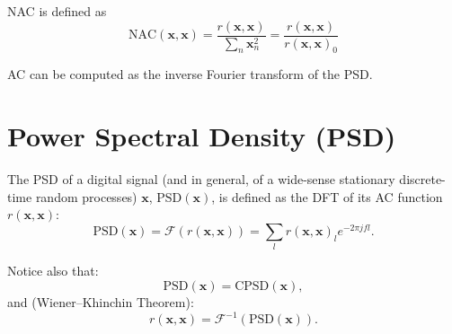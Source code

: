 \gls{NAC} is defined as
\begin{equation}
  {\text{NAC}(\mathbf{x},\mathbf{x})} = \frac{{r(\mathbf{x},\mathbf{x})}}{\sum_n \mathbf{x}_n^2} = \frac{{r(\mathbf{x},\mathbf{x})}}{{r(\mathbf{x},\mathbf{x})}_0}
\end{equation}

\gls{AC} can be computed as the inverse Fourier transform of
the \gls{PSD}.


\section{Power Spectral Density (PSD)}
\label{sec:PSD}

The \gls{PSD} of a digital signal (and in general, of a wide-sense
stationary discrete-time random processes) $\mathbf{x}$,
$\text{PSD}(\mathbf{x})$, is defined as the \gls{DFT} of its
\gls{AC} function $r(\mathbf{x},\mathbf{x})$:
\begin{equation}
  \text{PSD}(\mathbf{x}) = \mathcal{F}(r(\mathbf{x},\mathbf{x})) = \sum_l r(\mathbf{x},\mathbf{x})_le^{-2\pi jfl}.
\end{equation}

Notice also that:
\begin{equation}
  \text{PSD}(\mathbf{x}) = \text{CPSD}(\mathbf{x}),
\end{equation}
and (Wiener–Khinchin Theorem):
\begin{equation}
  r(\mathbf{x},\mathbf{x}) = \mathcal{F}^{-1}(\text{PSD}(\mathbf{x})).
\end{equation}


\begin{comment}
\section{Energy Spectral Density (ESD)}

The ESD of a signal describes the distribution of the
energy\footnote{That obviously must be finite.} of the signal over
their frequency components. For a discrete-time signal $\mathbf{x}$,
the $\text{ESD}(\mathbf{x})$ is defined as
\begin{equation}
  \text{ESD}(\mathbf{x})=|\mathbf{X}|^2=\mathbf{X}\mathbf{X}^*,
\end{equation}
where $\mathbf{X}$ the DFT of $\mathbf{x}$, and $\mathbf{X}^*$ is its
complex conjugate.

\end{comment}

